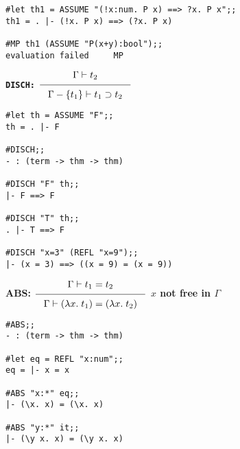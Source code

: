 \vskip7mm

\vskip 4mm
\begin{session}\begin{verbatim}
#let th1 = ASSUME "(!x:num. P x) ==> ?x. P x";;
th1 = . |- (!x. P x) ==> (?x. P x)

#MP th1 (ASSUME "P(x+y):bool");;
evaluation failed     MP
\end{verbatim}\end{session}





\vskip10mm
\bspindent\LARGE\bf
{\Large\tt DISCH:\quad}
$\Rule{\Gamma \vdash t_2}
{ \Gamma - \{ t_1 \} \vdash t_1 \supset t_2 }$
\espindent

\vskip5mm

\vskip 7mm

\vskip 4mm
\begin{session}\begin{verbatim}
#let th = ASSUME "F";;
th = . |- F

#DISCH;;
- : (term -> thm -> thm)

#DISCH "F" th;;
|- F ==> F

#DISCH "T" th;;
. |- T ==> F

#DISCH "x=3" (REFL "x=9");;
|- (x = 3) ==> ((x = 9) = (x = 9))
\end{verbatim}\end{session}



\vskip10mm
\bspindent\LARGE\bf
{\Large\bf ABS:\quad}
$\Rule{\Gamma \vdash t_1 = t_2}
{\Gamma \vdash (\lambda x. \; t_1) = (\lambda x.\; t_2) }$
\vskip4mm
{\Large\bf $x$ not free in $\Gamma$}
\espindent
\vskip7mm


\vskip 7mm
\vskip 4mm
\begin{session}\begin{verbatim}
#ABS;;
- : (term -> thm -> thm)

#let eq = REFL "x:num";;
eq = |- x = x

#ABS "x:*" eq;;
|- (\x. x) = (\x. x)

#ABS "y:*" it;;
|- (\y x. x) = (\y x. x)
\end{verbatim}\end{session}



